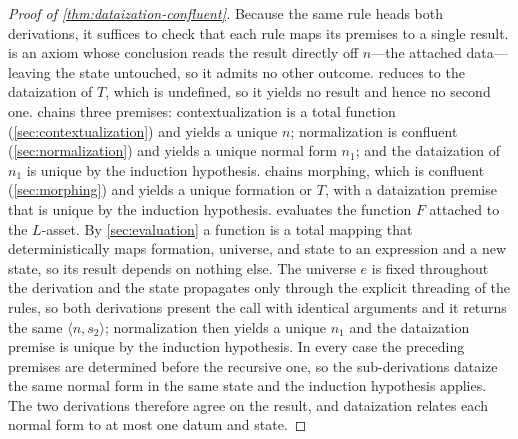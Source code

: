 \begin{proof}[Proof of \cref{thm:dataization-confluent}]
Because the same rule heads both derivations, it suffices to check that each
  rule maps its premises to a single result.
 is an axiom whose conclusion reads the result directly off
  \(n\)---the attached data---leaving the state untouched, so it admits no other
  outcome.
 reduces to the dataization of $T$, which is undefined, so it
  yields no result and hence no second one.
 chains three premises: contextualization is a total function
  (\cref{sec:contextualization}) and yields a unique \(n\); normalization is
  confluent (\cref{sec:normalization}) and yields a unique normal form \(n_1\);
  and the dataization of \(n_1\) is unique by the induction hypothesis.
 chains morphing, which is confluent (\cref{sec:morphing}) and
  yields a unique formation or $T$, with a dataization premise that is unique
  by the induction hypothesis.
 evaluates the function \(F\) attached to the $L$-asset.
By \cref{sec:evaluation} a function is a total mapping that deterministically
  maps formation, universe, and state to an expression and a new state,
  so its result depends on nothing else.
The universe \(e\) is fixed throughout the derivation and the state propagates
  only through the explicit threading of the rules, so both derivations present
  the call with identical arguments and it returns the same
  \(\langle n, s_2 \rangle\); normalization then yields a unique \(n_1\) and the
  dataization premise is unique by the induction hypothesis.
In every case the preceding premises are determined before the recursive one,
  so the sub-derivations dataize the same normal form in the same state and the
  induction hypothesis applies.
The two derivations therefore agree on the result, and dataization relates each
  normal form to at most one datum and state.
\end{proof}
